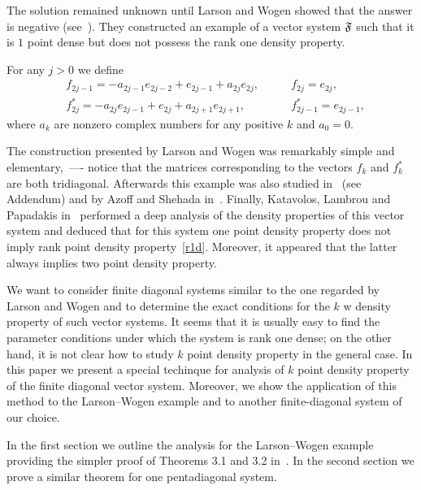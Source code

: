 \documentclass[12pt]{amsart}
\theoremstyle{case}
\begin{document}
  The solution remained unknown until Larson and Wogen showed that the answer is negative (see~\cite{larson}).
  They constructed an example of a vector system $\mathfrak{F}$ such that it is $1$ point dense but does not possess the rank one density property.
  \begin{example}
    \label{lw-sys}
    For any $j > 0$ we define
    \begin{align*}
      &f_{2j-1}=-a_{2j-1}e_{2j-2} + e_{2j-1} + a_{2j}e_{2j}, \qquad &f_{2j}=e_{2j},\\
      &f^*_{2j}=-a_{2j}e_{2j-1} + e_{2j} + a_{2j+1}e_{2j+1}, \qquad &f^*_{2j-1}=e_{2j-1},
    \end{align*}
    where $a_k$ are nonzero complex numbers for any positive $k$ and $a_0 = 0$.
  \end{example}
  The construction presented by Larson and Wogen was remarkably simple and elementary,~---- notice that the matrices corresponding to
    the vectors $f_k$ and $f^*_k$ are both tridiagonal.
  Afterwards this example was also studied in~\cite{argyroslambrou} (see Addendum) and by Azoff and Shehada in~\cite{azoff}.
  Finally, Katavolos, Lambrou and Papadakis in~\cite{katavolos} performed a deep analysis of the density properties
    of this vector system and deduced that for this system one point density property does not imply rank point density property~\ref{r1d}.
  Moreover, it appeared that the latter always implies two point density property.

  We want to consider finite diagonal systems similar to the one regarded by Larson and Wogen and to determine the exact conditions 
    for the $k$ w density property of such vector systems.
  It seems that it is usually easy to find the parameter conditions under which the system is rank one dense;
    on the other hand, it is not clear how to study $k$ point density property in the general case.
  In this paper we present a special techinque for analysis of $k$ point density property of the finite diagonal vector system.
  Moreover, we show the application of this method to the Larson--Wogen example and to another finite-diagonal system of our choice.

  In the first section we outline the analysis for the Larson--Wogen example providing the simpler proof of Theorems 3.1 and 3.2 in~\cite{katavolos}.
  In the second section we prove a similar theorem for one pentadiagonal system.

\end{document}
